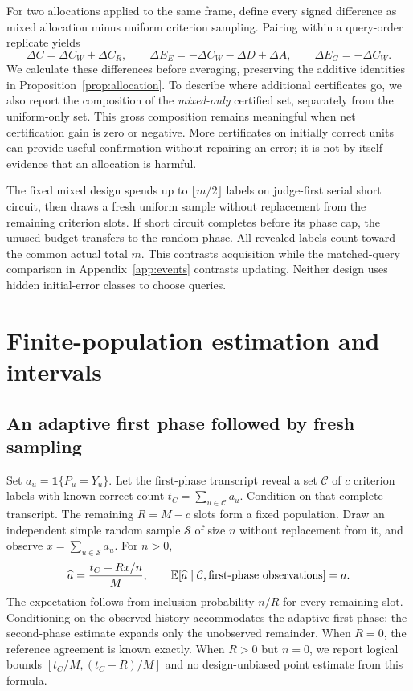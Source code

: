 For two allocations applied to the same frame, define every signed
difference as mixed allocation minus uniform criterion sampling. Pairing
within a query-order replicate yields
\begin{equation}
 \Delta C=\Delta C_W+\Delta C_R,
 \qquad
 \Delta E_E=-\Delta C_W-\Delta D+\Delta A,
 \qquad
 \Delta E_G=-\Delta C_W.
 \label{app:eq:paired-allocation}
\end{equation}
We calculate these differences before averaging, preserving the additive
identities in Proposition~\ref{prop:allocation}. To describe where additional certificates go, we also report the
composition of the \emph{mixed-only} certified set, separately from the
uniform-only set. This gross composition remains meaningful when net
certification gain is zero or negative. More certificates on initially
correct units can provide useful confirmation without repairing an error;
it is not by itself evidence that an allocation is harmful.

The fixed mixed design spends up to $\lfloor m/2\rfloor$ labels on
judge-first serial short circuit, then draws a fresh uniform sample without
replacement from the remaining criterion slots. If short circuit completes
before its phase cap, the unused budget transfers to the random phase. All
revealed labels count toward the common actual total $m$. This contrasts
acquisition while the matched-query comparison in
Appendix~\ref{app:events} contrasts updating. Neither design uses hidden
initial-error classes to choose queries.

\section{Finite-population estimation and intervals}
\label{app:inference}

\subsection{An adaptive first phase followed by fresh sampling}

Set $a_u=\mathbf1\{P_u=Y_u\}$. Let the first-phase transcript reveal a set
$\mathcal C$ of $c$ criterion labels with known correct count $t_C=\sum_{u\in\mathcal C}a_u$.
Condition on that complete transcript. The remaining $R=M-c$ slots form a
fixed population. Draw an independent simple random sample $\mathcal S$ of size $n$
without replacement from it, and observe $x=\sum_{u\in\mathcal S}a_u$. For $n>0$,
\begin{equation}
 \widehat a=\frac{t_C+R x/n}{M},
 \qquad \mathbb E[\widehat a\mid\mathcal C,\hbox{first-phase observations}]=a.
 \label{app:eq:conditional-estimator}
\end{equation}
The expectation follows from inclusion probability $n/R$ for every remaining
slot. Conditioning on the observed history accommodates the adaptive first
phase: the second-phase estimate expands only the unobserved remainder.
When $R=0$, the reference agreement is known exactly. When $R>0$ but $n=0$,
we report logical bounds $[t_C/M,(t_C+R)/M]$ and no design-unbiased point
estimate from this formula.

